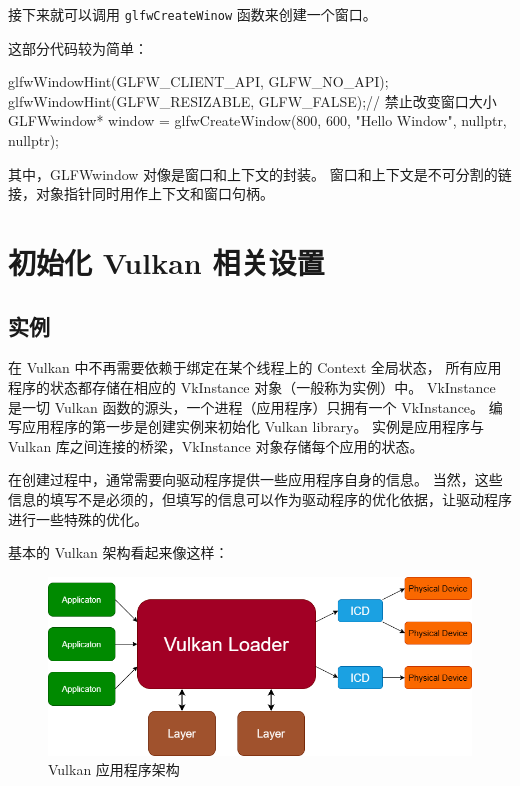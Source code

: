 \documentclass[a4paper, 12pt]{ctexart}
\begin{document}
    接下来就可以调用 \texttt{glfwCreateWinow} 函数来创建一个窗口。

    这部分代码较为简单：

\begin{cppcode}
 glfwWindowHint(GLFW_CLIENT_API, GLFW_NO_API);
 glfwWindowHint(GLFW_RESIZABLE, GLFW_FALSE);// 禁止改变窗口大小
 GLFWwindow* window =
     glfwCreateWindow(800, 600, "Hello Window", nullptr, nullptr);
\end{cppcode}
    
    其中，GLFWwindow 对像是窗口和上下文的封装。
    窗口和上下文是不可分割的链接，对象指针同时用作上下文和窗口句柄。




\clearpage
\section{初始化 Vulkan 相关设置}
\subsection{实例}
    在 Vulkan 中不再需要依赖于绑定在某个线程上的 Context 全局状态，
    所有应用程序的状态都存储在相应的 VkInstance 对象（一般称为实例）中。
    VkInstance 是一切 Vulkan 函数的源头，一个进程（应用程序）只拥有一个 VkInstance。
    编写应用程序的第一步是创建实例来初始化 Vulkan library。
    实例是应用程序与 Vulkan 库之间连接的桥梁，VkInstance 对象存储每个应用的状态。
    
    在创建过程中，通常需要向驱动程序提供一些应用程序自身的信息。
    当然，这些信息的填写不是必须的，但填写的信息可以作为驱动程序的优化依据，让驱动程序进行一些特殊的优化。

    基本的 Vulkan 架构看起来像这样：

    \begin{figure}[htbp]
        \centering
        \includegraphics[scale = 0.6]{images/Instance.png}
        \caption{Vulkan 应用程序架构}
    \end{figure}
\end{document}

